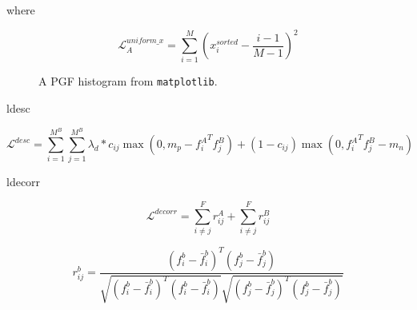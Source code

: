where

\[
\mathcal{L}^{uniform\_x}_A=\sum_{i=1}^M\left(x_i^{sorted}-\frac{i-1}{M-1}\right)^2
\]

\begin{figure}[H]
	\begin{center}
		
	\end{center}
	\caption{A PGF histogram from \texttt{matplotlib}.}
\end{figure}

ldesc

\[
\mathcal{L}^{desc}=\sum^{M^B}_{i=1}\sum^{M^B}_{j=1}\lambda_d*c_{ij}\max\left(0,m_p-{f_i^A}^Tf_j^B\right)+(1-c_{ij})\max\left(0,{f_i^A}^Tf_j^B-m_n\right)
\]

ldecorr

\[
\mathcal{L}^{decorr}=\sum^F_{i\neq j}r_{ij}^A+\sum^F_{i\neq j}r_{ij}^B
\]

\[
r^b_{ij}=
\frac{(f_i^b-\bar{f}^b_i)^T(f_j^b-\bar{f}^b_j)}
{
\sqrt{(f_i^b-\bar{f}^b_i)^T(f_i^b-\bar{f}^b_i)}
\sqrt{(f_j^b-\bar{f}^b_j)^T(f_j^b-\bar{f}^b_j)}
}
\]
